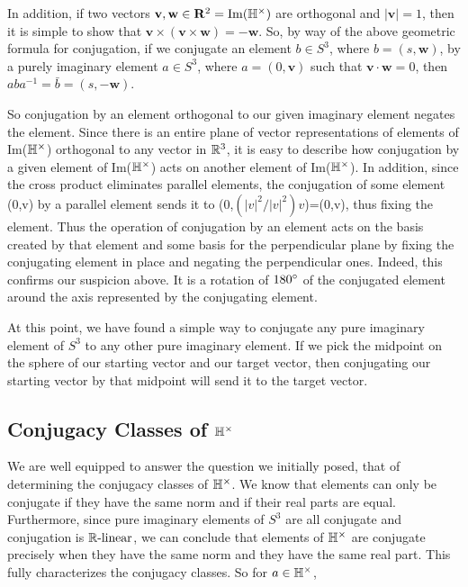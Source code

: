 \documentclass{article}
\begin{document}
In addition, if two vectors $\mathbf{v},\mathbf{w} \in \mathbf{R}^2 = \text{Im}(\protect\mathbb{H}^\times)$ are orthogonal and $|\mathbf{v}| = 1$, then it is simple to show that $\mathbf{v} \times (\mathbf{v} \times \mathbf{w}) = -\mathbf{w}$.  So, by way of the above geometric formula for conjugation, if we conjugate an element $b \in S^3$, where $b=(s, \mathbf{w})$, by a purely imaginary element $a \in S^3$, where $a=(0,\mathbf{v})$ such that $\mathbf{v} \cdot \mathbf{w} = 0$, then $aba^{-1} = \bar{b} = (s, -\mathbf{w})$.

So conjugation by an element orthogonal to our given imaginary element negates the element. Since there is an entire plane of vector representations of elements of Im($\protect\mathbb{H}^\times$) orthogonal to any vector in $\protect\mathbb{R}^3$, it is easy to describe how conjugation by a given element of Im($\protect\mathbb{H}^\times$) acts on another element of Im($\protect\mathbb{H}^\times$). In addition, since the cross product eliminates parallel elements, the conjugation of some element (0,v) by a parallel element sends it to (0,$({|v|}^2 / {|v|}^2)v$)=(0,v), thus fixing the element. Thus the operation of conjugation by an element acts on the basis created by that element and some basis for the perpendicular plane by fixing the conjugating element in place and negating the perpendicular ones. Indeed, this confirms our suspicion above. It is a rotation of $180\degree$ of the conjugated element around the axis represented by the conjugating element.

At this point, we have found a simple way to conjugate any pure imaginary element of $S^3$ to any other pure imaginary element. If we pick the midpoint on the sphere of our starting vector and our target vector, then conjugating our starting vector by that midpoint will send it to the target vector. 

\subsection{Conjugacy Classes of $\protect\mathbb{H}^\times$}

We are well equipped to answer the question we initially posed, that of determining the conjugacy classes of $\protect\mathbb{H}^\times$. We know that elements can only be conjugate if they have the same norm and if their real parts are equal. Furthermore, since pure imaginary elements of $S^3$ are all conjugate and conjugation is $\protect\mathbb{R}\text{-linear}$, we can conclude that elements of $\protect\mathbb{H}^\times$ are conjugate precisely when they have the same norm and they have the same real part. This fully characterizes the conjugacy classes. So for $a \in \protect\mathbb{H}^\times$,
\end{document}
